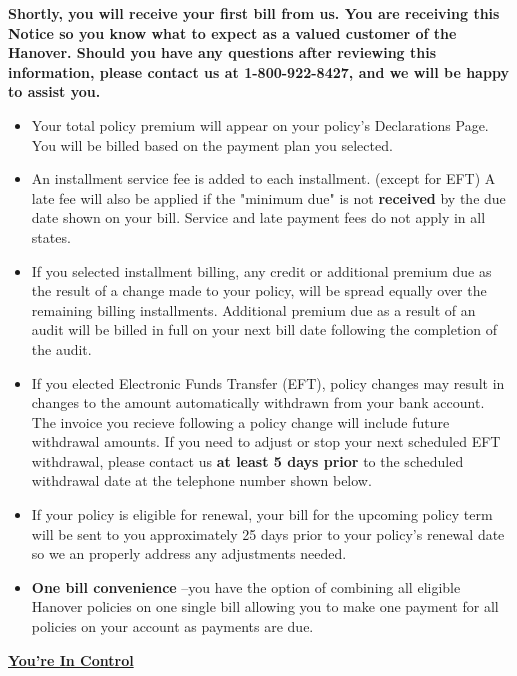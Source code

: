 \documentclass[10pt]{article}
\begin{document}
\hfill \break
\noindent \textbf{Shortly, you will receive your first bill from us. You are receiving this Notice so you know what to expect as a valued
customer of the Hanover. Should you have any questions after reviewing this information, please contact us at 
1-800-922-8427, and we will be happy to assist you.}

\begin{itemize}
    \itemsep0em
    \item Your total policy premium will appear on your policy's Declarations Page. You will be billed based on the payment plan you selected.

    \item An installment service fee is added to each installment. (except for EFT) A late fee will also be applied if the "minimum due" is not \textbf{received} by the due date shown on your bill. Service and late payment fees do not apply in all states.

    \item If you selected installment billing, any credit or additional premium due as the result of a change made to your policy, will be spread equally over the remaining billing installments. Additional premium due as a result of an audit will be billed in full on your next bill date following the completion of the audit.

    \item If you elected Electronic Funds Transfer (EFT), policy changes may result in changes to the amount automatically withdrawn from your bank account. The invoice you recieve following a policy change will include future withdrawal amounts. If you need to adjust or stop your next scheduled EFT withdrawal, please contact us \textbf{at least 5 days prior} to the scheduled withdrawal date at the telephone number shown below.

    \item If your policy is eligible for renewal, your bill for the upcoming policy term will be sent to you approximately 25 days prior to your policy's renewal date so we an properly address any adjustments needed.
    
    \item \textbf{One bill convenience} --you have the option of combining all eligible Hanover policies on one single bill allowing you to make one payment for all policies on your account as payments are due.
\end{itemize}

\noindent \textbf{\underline{You're In Control}}
\end{document}
